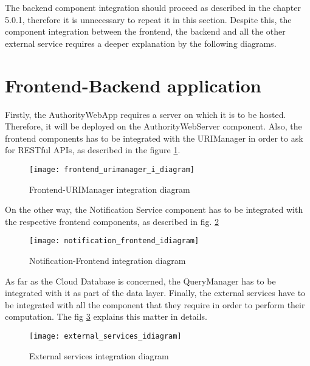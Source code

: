 The backend component integration should proceed as described in the chapter 5.0.1, therefore it is unnecessary to repeat it in this section.
Despite this, the component integration between the frontend, the backend and all the other external service requires a deeper explanation by the following diagrams.
\section{Frontend-Backend application}
Firstly, the AuthorityWebApp requires a server on which it is to be hosted. Therefore, it will be deployed on the AuthorityWebServer component.
Also, the frontend components has to be integrated with the URIManager in order to ask for RESTful APIs, as described in the figure \ref{fig:frontend_urimanager_i_diagram}.
\begin{figure}[H]
    \centering
    \texttt{[image: frontend\_urimanager\_i\_diagram]}
    \caption{Frontend-URIManager integration diagram}
    \label{fig:frontend_urimanager_i_diagram}
\end{figure}
On the other way, the Notification Service component has to be integrated with the respective frontend components, as described in fig. \ref{fig:notification_frontend_idiagram}
\begin{figure}[H]
    \centering
    \texttt{[image: notification\_frontend\_idiagram]}
    \caption{Notification-Frontend integration diagram}
    \label{fig:notification_frontend_idiagram}
\end{figure}
As far as the Cloud Database is concerned, the QueryManager has to be integrated with it as part of the data layer.
Finally, the external services have to be integrated with all the component that they require in order to perform their computation. The fig \ref{fig:external_services_idiagram} explains this matter in details.
\begin{figure}[H]
    \centering
    \texttt{[image: external\_services\_idiagram]}
    \caption{External services integration diagram}
    \label{fig:external_services_idiagram}
\end{figure}
